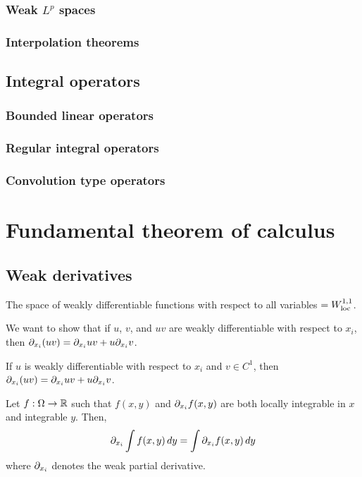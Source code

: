 \documentclass{../note}
\begin{document}
\section{Weak $L^p$ spaces}
\section{Interpolation theorems}

\chapter{Integral operators}
\section{Bounded linear operators}
\section{Regular integral operators}
\section{Convolution type operators}





\part{Fundamental theorem of calculus}

\chapter{Weak derivatives}

The space of weakly differentiable functions with respect to all variables $=W_{\mathrm{loc}}^{1,1}$.

\begin{prb}
We want to show that if $u$, $v$, and $uv$ are weakly differentiable with respect to $x_i$, then $\pd_{x_i}(uv)=\pd_{x_i}uv+u\pd_{x_i}v$.
\begin{parts}
\item If $u$ is weakly differentiable with respect to $x_i$ and $v\in C^1$, then $\pd_{x_i}(uv)=\pd_{x_i}uv+u\pd_{x_i}v$.
\end{parts}
\end{prb}


\begin{prb}
Let $f:\Omega\to\mathbb{R}$
such that $f(x,y)$ and $\pd_{x_i}f(x,y)$ are both locally integrable in $x$ and integrable $y$.
Then,
\[\pd_{x_i}\int f(x,y)\,dy=\int\pd_{x_i}f(x,y)\,dy\]
where $\pd_{x_i}$ denotes the weak partial derivative.
\end{prb}
\end{document}
